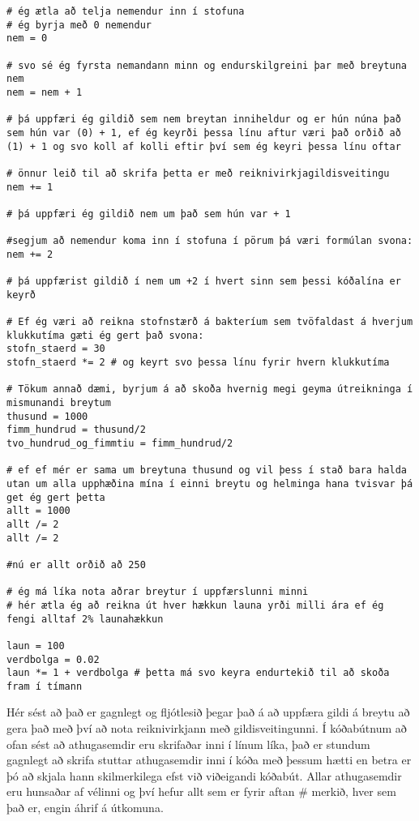 \begin{lstlisting}[caption="Reiknivirkjagildisveiting", label=lst:reiknivirkjagildisveiting]
# ég ætla að telja nemendur inn í stofuna
# ég byrja með 0 nemendur
nem = 0

# svo sé ég fyrsta nemandann minn og endurskilgreini þar með breytuna nem
nem = nem + 1

# þá uppfæri ég gildið sem nem breytan inniheldur og er hún núna það sem hún var (0) + 1, ef ég keyrði þessa línu aftur væri það orðið að (1) + 1 og svo koll af kolli eftir því sem ég keyri þessa línu oftar

# önnur leið til að skrifa þetta er með reiknivirkjagildisveitingu
nem += 1

# þá uppfæri ég gildið nem um það sem hún var + 1

#segjum að nemendur koma inn í stofuna í pörum þá væri formúlan svona:
nem += 2

# þá uppfærist gildið í nem um +2 í hvert sinn sem þessi kóðalína er keyrð

# Ef ég væri að reikna stofnstærð á bakteríum sem tvöfaldast á hverjum klukkutíma gæti ég gert það svona:
stofn_staerd = 30
stofn_staerd *= 2 # og keyrt svo þessa línu fyrir hvern klukkutíma

# Tökum annað dæmi, byrjum á að skoða hvernig megi geyma útreikninga í mismunandi breytum
thusund = 1000
fimm_hundrud = thusund/2
tvo_hundrud_og_fimmtiu = fimm_hundrud/2

# ef ef mér er sama um breytuna thusund og vil þess í stað bara halda utan um alla upphæðina mína í einni breytu og helminga hana tvisvar þá get ég gert þetta
allt = 1000
allt /= 2
allt /= 2

#nú er allt orðið að 250

# ég má líka nota aðrar breytur í uppfærslunni minni
# hér ætla ég að reikna út hver hækkun launa yrði milli ára ef ég fengi alltaf 2% launahækkun

laun = 100
verdbolga = 0.02
laun *= 1 + verdbolga # þetta má svo keyra endurtekið til að skoða fram í tímann

\end{lstlisting}

Hér sést að það er gagnlegt og fljótlesið þegar það á að uppfæra gildi á breytu að gera það með því að nota reiknivirkjann með gildisveitingunni.
Í kóðabútnum að ofan sést að athugasemdir eru skrifaðar inni í línum líka, það er stundum gagnlegt að skrifa stuttar athugasemdir inni í kóða með þessum hætti en betra er þó að skjala hann skilmerkilega efst við viðeigandi kóðabút.
Allar athugasemdir eru hunsaðar af vélinni og því hefur allt sem er fyrir aftan \# merkið, hver sem það er, engin áhrif á útkomuna.

